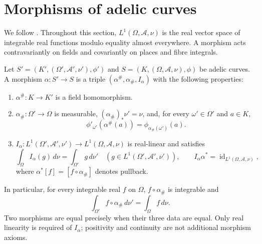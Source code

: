 \section{Morphisms of adelic curves}

We follow \cite[\S3.7]{chen-moriwaki}. Throughout this section,
$L^1(\Omega,\mathcal A,\nu)$ is the real vector space of integrable
real functions modulo equality almost everywhere. A morphism acts
contravariantly on fields and covariantly on places and fibre integrals.

\begin{definition}
\label{def:adelic-morphism}
\leanok
{}
Let $S'=(K',(\Omega',\mathcal A',\nu'),\phi')$ and
$S=(K,(\Omega,\mathcal A,\nu),\phi)$ be adelic curves.
A morphism $\alpha:S'\to S$ is a triple
$(\alpha^\#,\alpha_\#,I_\alpha)$ with the following properties:
\begin{enumerate}
\item $\alpha^\#:K\to K'$ is a field homomorphism.
\item $\alpha_\#: \Omega'\to\Omega$ is measurable,
$(\alpha_\#)_*\nu'=\nu$, and, for every $\omega'\in\Omega'$ and
$a\in K$,
\[
 \phi'_{\omega'}(\alpha^\#(a))
   =\phi_{\alpha_\#(\omega')}(a).
\]
\item $I_\alpha:L^1(\Omega',\mathcal A',\nu')
\to L^1(\Omega,\mathcal A,\nu)$ is real-linear and satisfies
\[
 \int_\Omega I_\alpha(g)\,d\nu
   =\int_{\Omega'}g\,d\nu'
 \quad(g\in L^1(\Omega',\mathcal A',\nu')),
 \qquad
 I_\alpha\alpha^*=\operatorname{id}_{L^1(\Omega,\mathcal A,\nu)},
\]
where $\alpha^*[f]=[f\circ\alpha_\#]$ denotes pullback.
\end{enumerate}
In particular, for every integrable real $f$ on $\Omega$,
$f\circ\alpha_\#$ is integrable and
\[
 \int_{\Omega'}f\circ\alpha_\#\,d\nu'
   =\int_\Omega f\,d\nu.
\]
Two morphisms are equal precisely when their three data are equal.
Only real linearity is required of $I_\alpha$; positivity and
continuity are not additional morphism axioms.
\end{definition}
